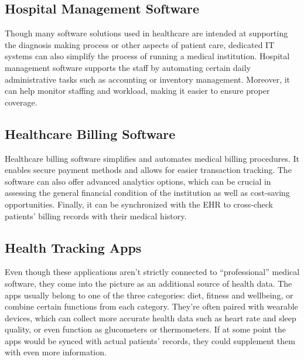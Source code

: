 \documentclass[11pt,a4paper,twoside]{article}
\begin{document}
\subsection{Hospital Management Software}
Though many software solutions used in healthcare are intended at supporting the diagnosis making process or other aspects of patient care, dedicated IT systems can also simplify the process of running a medical institution. Hospital management software supports the staff by automating certain daily administrative tasks such as accounting or inventory management. Moreover, it can help monitor staffing and workload, making it easier to ensure proper coverage.
\subsection{Healthcare Billing Software}
Healthcare billing software simplifies and automates medical billing procedures. It enables secure payment methods and allows for easier transaction tracking. The software can also offer advanced analytics options, which can be crucial in assessing the general financial condition of the institution as well as cost-saving opportunities. Finally, it can be synchronized with the EHR to cross-check patients’ billing records with their medical history.
\subsection{Health Tracking Apps}
Even though these applications aren’t strictly connected to “professional” medical software, they come into the picture as an additional source of health data. The apps usually belong to one of the three categories: diet, fitness and wellbeing, or combine certain functions from each category. They're often paired with wearable devices, which can collect more accurate health data such as heart rate and sleep quality, or even function as glucometers or thermometers. If at some point the apps would be synced with actual patients’ records, they could supplement them with even more information.
\end{document}
